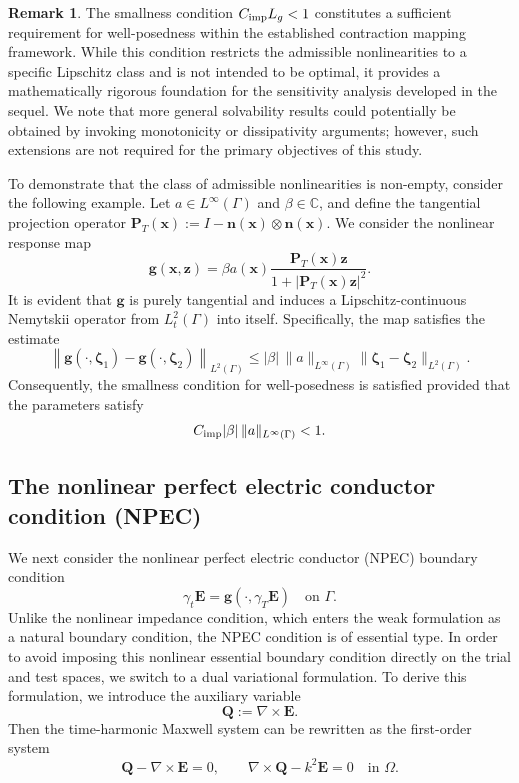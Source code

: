 \documentclass[12pt,reqno]{amsart}
\theoremstyle{definition}
\newtheorem{rema}[theo]{ Remark}
\numberwithin{equation}{section}
\begin{document}
\begin{rema}
The smallness condition $C_{\rm imp} L_g < 1$ constitutes a sufficient requirement for well-posedness within the established contraction mapping framework. While this condition restricts the admissible nonlinearities to a specific Lipschitz class and is not intended to be optimal, it provides a mathematically rigorous foundation for the sensitivity analysis developed in the sequel. We note that more general solvability results could potentially be obtained by invoking monotonicity or dissipativity arguments; however, such extensions are not required for the primary objectives of this study.

To demonstrate that the class of admissible nonlinearities is non-empty, consider the following example. Let $a \in L^\infty(\Gamma)$ and $\beta \in \mathbb{C}$, and define the tangential projection operator $\mathbf{P}_T(\boldsymbol{x}) := I - \mathbf{n}(\boldsymbol{x}) \otimes \mathbf{n}(\boldsymbol{x})$. We consider the nonlinear response map
\[
\mathbf{g}(\boldsymbol{x}, \boldsymbol{z}) = \beta a(\boldsymbol{x}) \frac{\mathbf{P}_T(\boldsymbol{x}) \boldsymbol{z}}{1 + |\mathbf{P}_T(\boldsymbol{x}) \boldsymbol{z}|^2}.
\]
It is evident that $\mathbf{g}$ is purely tangential and induces a Lipschitz-continuous Nemytskii operator from $L_t^2(\Gamma)$ into itself. Specifically, the map satisfies the estimate
\[
\left\| \mathbf{g}(\cdot, \boldsymbol{\zeta}_1) - \mathbf{g}(\cdot, \boldsymbol{\zeta}_2) \right\|_{L^2(\Gamma)} \le |\beta| \, \|a\|_{L^\infty(\Gamma)} \|\boldsymbol{\zeta}_1 - \boldsymbol{\zeta}_2\|_{L^2(\Gamma)}.
\]
Consequently, the smallness condition for well-posedness is satisfied provided that the parameters satisfy
\[
C_{\rm imp} |\beta| \, \|a\|_{L^\infty(\Gamma)} < 1.
\]
\end{rema}



\subsection{The nonlinear perfect electric conductor condition (NPEC)}

We next consider the nonlinear perfect electric conductor (NPEC) boundary
condition
\begin{equation}\label{eq:npec_boundary_condition}
\gamma_t\mathbf E
=
\mathbf g(\cdot,\gamma_T\mathbf E)
\quad\text{on }\Gamma .
\end{equation}
Unlike the nonlinear impedance condition, which enters the weak formulation
as a natural boundary condition, the NPEC condition is of essential type.
In order to avoid imposing this nonlinear essential boundary condition
directly on the trial and test spaces, we switch to a dual  variational
formulation. To derive this formulation, we introduce the auxiliary variable
\[
\mathbf Q:=\nabla\times\mathbf E .
\]
Then the time-harmonic Maxwell system can be rewritten as the first-order
system
\[
\mathbf Q-\nabla\times\mathbf E=0,
\qquad
\nabla\times\mathbf Q-k^2\mathbf E=0
\quad\text{in }\Omega .
\]
\end{document}
